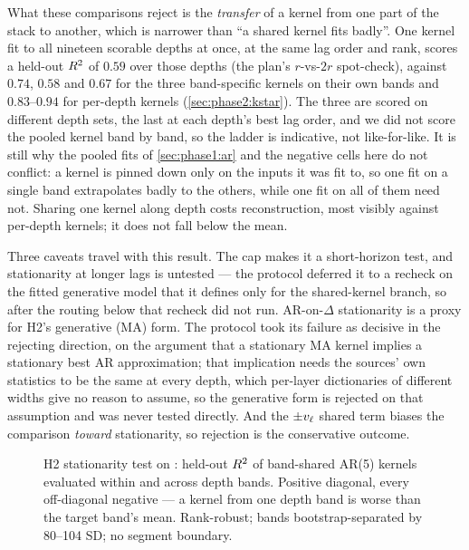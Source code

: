 What these comparisons reject is the \emph{transfer} of a kernel from one
part of the stack to another, which is narrower than ``a shared kernel fits
badly''. One kernel fit to all nineteen scorable depths at once, at the same
lag order and rank, scores a held-out $R^2$ of $0.59$ over those depths
(the plan's $r$-vs-$2r$ spot-check), against $0.74$, $0.58$ and $0.67$ for
the three band-specific kernels on their own bands and $0.83$--$0.94$ for
per-depth kernels (\cref{sec:phase2:kstar}). The three are scored on
different depth sets, the last at each depth's best lag order, and we did
not score the pooled kernel band by band, so the ladder is indicative, not
like-for-like. It is still why the pooled fits of \cref{sec:phase1:ar} and
the negative cells here do not conflict: a kernel is pinned down only on the
inputs it was fit to, so one fit on a single band extrapolates badly to the
others, while one fit on all of them need not. Sharing one kernel along
depth costs reconstruction, most visibly against per-depth kernels; it does
not fall below the mean.

Three caveats travel with this result. The cap makes it a short-horizon
test, and stationarity at longer lags is untested --- the protocol deferred
it to a recheck on the fitted generative model that it defines only for the
shared-kernel branch, so after the routing below that recheck did not run.
AR-on-$\Delta$ stationarity is a proxy for H2's generative (MA) form. The
protocol took its failure as decisive in the rejecting direction, on the
argument that a stationary MA kernel implies a stationary best AR
approximation; that implication needs the sources' own statistics to be the
same at every depth, which per-layer dictionaries of different widths give
no reason to assume, so the generative form is rejected on that assumption
and was never tested directly. And the $\pm v_\ell$ shared term biases the
comparison \emph{toward} stationarity, so rejection is the conservative
outcome.

\begin{figure}[t]
  \centering
  
  \caption{H2 stationarity test on \pythia{}: held-out $R^2$ of band-shared
  AR(5) kernels evaluated within and across depth bands. Positive diagonal,
  every off-diagonal negative --- a kernel from one depth band is worse than
  the target band's mean. Rank-robust; bands bootstrap-separated by 80--104
  SD; no segment boundary.}
  \label{fig:h2}
\end{figure}

